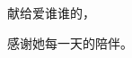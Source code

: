 
\thispagestyle{empty}

\begin{center}
献给爱谁谁的，

感谢她每一天的陪伴。
\end{center}

\setlength{\abovedisplayskip}{-5pt}
\setlength{\abovedisplayshortskip}{-5pt}
